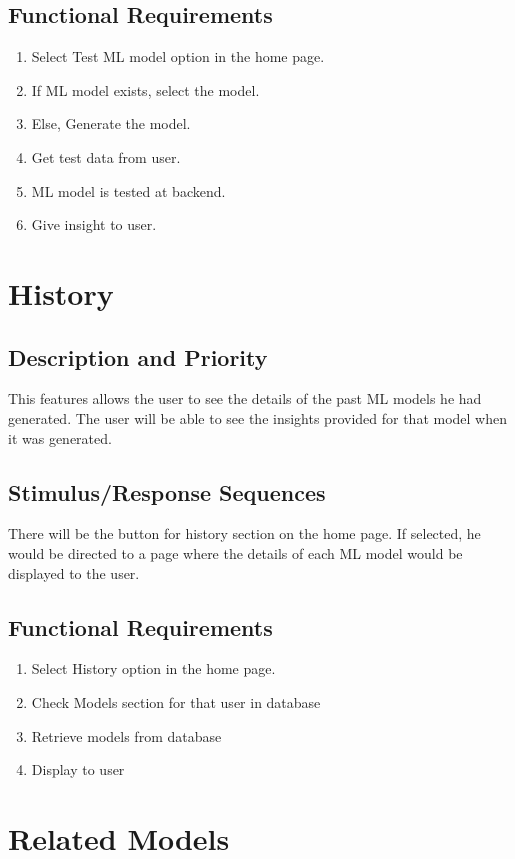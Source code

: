 \documentclass{scrreprt}
\begin{document}
\subsection{Functional Requirements}
\begin{enumerate}
\item Select Test ML model option in the home page.
\item If ML model exists, select the model.
\item Else, Generate the model.
\item Get test data from user.
\item ML model is tested at backend.
\item Give insight to user.
\end{enumerate}

\section{History}

\subsection{Description and Priority}
This features allows the user to see the details of the past ML models he had generated. The user will be able to see the insights provided for that model when it was generated.

\subsection{Stimulus/Response Sequences}
 There will be the button for history section on the home page. If selected, he would be directed to a page where the details of each ML model would be displayed to the user.

\subsection{Functional Requirements}
\begin{enumerate}
\item Select History option in the home page.
\item Check Models section for that user in database
\item Retrieve models from database
\item Display to user
\end{enumerate}

\section{Related Models}
\end{document}
